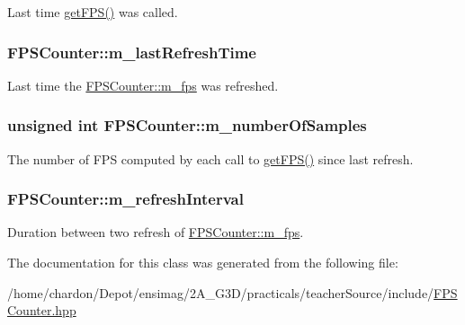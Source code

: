 Last time \hyperlink{classFPSCounter_a2b7e118b610867e4f62b359eb589e65f}{get\+F\+P\+S()} was called. \hypertarget{classFPSCounter_a1e88f7c01b50ddb5b113ed6cc95335bb}{
\subsubsection[{m\+\_\+last\+Refresh\+Time}]{ F\+P\+S\+Counter\+::m\+\_\+last\+Refresh\+Time\hspace{0.3cm}{\ttfamily [private]}}}\label{classFPSCounter_a1e88f7c01b50ddb5b113ed6cc95335bb}
Last time the \hyperlink{classFPSCounter_a29bfe52f7ae0f66958aab30e268e95ed}{F\+P\+S\+Counter\+::m\+\_\+fps} was refreshed. \hypertarget{classFPSCounter_af985f96020619ec9c94dc1d059f4512d}{
\subsubsection[{m\+\_\+number\+Of\+Samples}]{\setlength{\rightskip}{0pt plus 5cm}unsigned int F\+P\+S\+Counter\+::m\+\_\+number\+Of\+Samples\hspace{0.3cm}{\ttfamily [private]}}}\label{classFPSCounter_af985f96020619ec9c94dc1d059f4512d}
The number of F\+P\+S computed by each call to \hyperlink{classFPSCounter_a2b7e118b610867e4f62b359eb589e65f}{get\+F\+P\+S()} since last refresh. \hypertarget{classFPSCounter_a419142db73c011e326309be159419796}{
\subsubsection[{m\+\_\+refresh\+Interval}]{ F\+P\+S\+Counter\+::m\+\_\+refresh\+Interval\hspace{0.3cm}{\ttfamily [private]}}}\label{classFPSCounter_a419142db73c011e326309be159419796}
Duration between two refresh of \hyperlink{classFPSCounter_a29bfe52f7ae0f66958aab30e268e95ed}{F\+P\+S\+Counter\+::m\+\_\+fps}. 

The documentation for this class was generated from the following file\+:\begin{DoxyCompactItemize}
\item 
/home/chardon/\+Depot/ensimag/2\+A\+\_\+\+G3\+D/practicals/teacher\+Source/include/\hyperlink{FPSCounter_8hpp}{F\+P\+S\+Counter.\+hpp}\end{DoxyCompactItemize}
